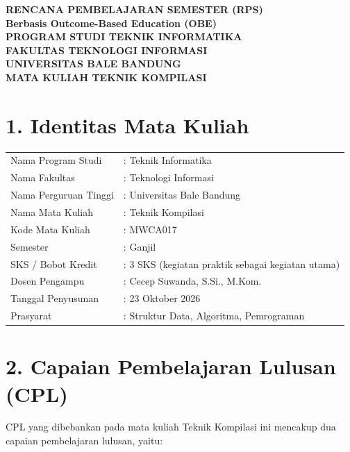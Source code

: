 \documentclass[12pt,a4paper]{article}
\begin{document}
\begin{center}
\textbf{\Large RENCANA PEMBELAJARAN SEMESTER (RPS)}\\
\textbf{Berbasis Outcome-Based Education (OBE)}\\[0.5cm]
\textbf{PROGRAM STUDI TEKNIK INFORMATIKA}\\
\textbf{FAKULTAS TEKNOLOGI INFORMASI}\\
\textbf{UNIVERSITAS BALE BANDUNG}\\[0.3cm]
\textbf{MATA KULIAH TEKNIK KOMPILASI}
\end{center}

\vspace{1cm}

\section*{1. Identitas Mata Kuliah}
\begin{tabular}{ll}
Nama Program Studi & : Teknik Informatika \\
Nama Fakultas & : Teknologi Informasi \\
Nama Perguruan Tinggi & : Universitas Bale Bandung \\
Nama Mata Kuliah & : Teknik Kompilasi \\
Kode Mata Kuliah & : MWCA017 \\
Semester & : Ganjil \\
SKS / Bobot Kredit & : 3 SKS (kegiatan praktik sebagai kegiatan utama) \\
Dosen Pengampu & : Cecep Suwanda, S.Si., M.Kom. \\
Tanggal Penyusunan & : 23 Oktober 2026 \\
Prasyarat & : Struktur Data, Algoritma, Pemrograman \\
\end{tabular}

\vspace{0.5cm}

\section*{2. Capaian Pembelajaran Lulusan (CPL)}

CPL yang dibebankan pada mata kuliah Teknik Kompilasi ini mencakup dua capaian pembelajaran lulusan, yaitu:
\end{document}

